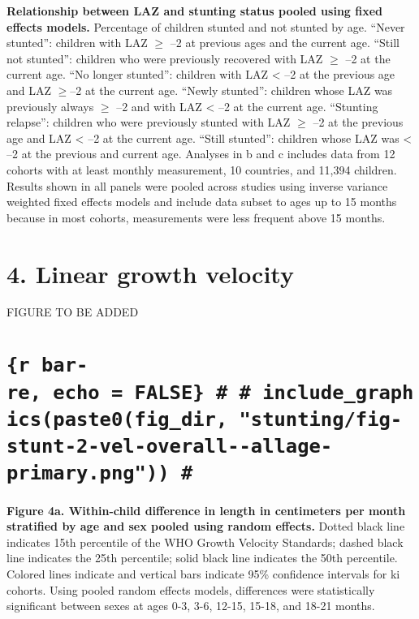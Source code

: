\documentclass[9pt,]{article}
\begin{document}
\textbf{Relationship between LAZ and stunting status pooled using fixed
effects models.} Percentage of children stunted and not stunted by age.
``Never stunted'': children with LAZ \(\ge\) --2 at previous ages and
the current age. ``Still not stunted'': children who were previously
recovered with LAZ \(\ge\) --2 at the current age. ``No longer
stunted'': children with LAZ \textless{} --2 at the previous age and LAZ
\(\ge\)--2 at the current age. ``Newly stunted'': children whose LAZ was
previously always \(\ge\) --2 and with LAZ \textless{} --2 at the
current age. ``Stunting relapse'': children who were previously stunted
with LAZ \(\ge\) --2 at the previous age and LAZ \textless{} --2 at the
current age. ``Still stunted'': children whose LAZ was \textless{} --2
at the previous and current age. Analyses in b and c includes data from
12 cohorts with at least monthly measurement, 10 countries, and 11,394
children. Results shown in all panels were pooled across studies using
inverse variance weighted fixed effects models and include data subset
to ages up to 15 months because in most cohorts, measurements were less
frequent above 15 months.

\hypertarget{linear-growth-velocity}{%
\section{4. Linear growth velocity}\label{linear-growth-velocity}}

FIGURE TO BE ADDED

\hypertarget{r-bar-re-echo-false-include_graphicspaste0fig_dir-stuntingfig-stunt-2-vel-overall--allage-primary.png}{%
\section{\texorpdfstring{\texttt{\{r\ bar-re,\ echo\ =\ FALSE\}\ \#\ \#\ include\_graphics(paste0(fig\_dir,\ "stunting/fig-stunt-2-vel-overall-\/-allage-primary.png"))\ \#}}{\{r bar-re, echo = FALSE\} \# \# include\_graphics(paste0(fig\_dir, "stunting/fig-stunt-2-vel-overall-\/-allage-primary.png")) \#}}\label{r-bar-re-echo-false-include_graphicspaste0fig_dir-stuntingfig-stunt-2-vel-overall--allage-primary.png}}

\textbf{Figure 4a. Within-child difference in length in centimeters per
month stratified by age and sex pooled using random effects.} Dotted
black line indicates 15th percentile of the WHO Growth Velocity
Standards; dashed black line indicates the 25th percentile; solid black
line indicates the 50th percentile. Colored lines indicate and vertical
bars indicate 95\% confidence intervals for ki cohorts. Using pooled
random effects models, differences were statistically significant
between sexes at ages 0-3, 3-6, 12-15, 15-18, and 18-21 months.
\end{document}
